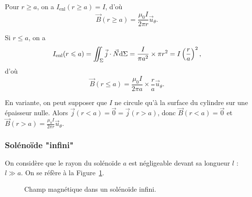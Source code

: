             Pour $r\geqslant a$, on a $I_{\text{enl}}(r\geqslant a)=I$, d'où 
            \begin{equation}
                \boxed{
                    \vec{B}(r\geqslant a)=\frac{\mu_0 I}{2\pi r}\vec{u}_{\theta}.
                }
            \end{equation}

            Si $r\leqslant a$, on a 
            \begin{equation}
                I_{\text{enl}}(r\leqslant a)=\iint_{\Sigma}\vec{j}\cdot\vec{N}\mathrm{d}\Sigma=\frac{I}{\pi a^{2}}\times\pi r^{2}=I\left(\frac{r}{a}\right)^{2},
            \end{equation}
            d'où
            \begin{equation}
                \boxed{
                \vec{B}(r\leqslant a)=\frac{\mu_0 I}{2\pi a}\times\frac{r}{a}\vec{u}_{\theta}.}
            \end{equation}

            En variante, on peut supposer que $I$ ne circule qu'à la surface du cylindre sur une épaisseur nulle. Alors $\vec{j}(r<a)=\vec{0}=\vec{j}(r>a)$, donc $\vec{B}(r<a)=\vec{0}$ et $\vec{B}(r>a)=\frac{\mu_0 I}{2\pi r}\vec{u}_{\theta}$.

        \subsubsection{Solénoïde "infini"}

            On considère que le rayon du solénoïde $a$ est négligeable devant sa longueur $l$ : $l\gg a$. On se réfère à la Figure~\ref{fig:solenoide_infini_champ_B}.

            \begin{figure}
                \centering
                \caption{Champ magnétique dans un solénoïde infini.}    
                \label{fig:solenoide_infini_champ_B}
            \end{figure}

